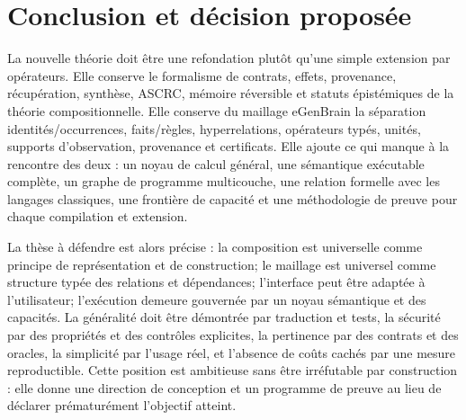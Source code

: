 \documentclass[11pt,a4paper]{article}
\begin{document}
\section{Conclusion et décision proposée}
La nouvelle théorie doit être une refondation plutôt qu'une simple extension par opérateurs. Elle conserve le formalisme de contrats, effets, provenance, récupération, synthèse, ASCRC, mémoire réversible et statuts épistémiques de la théorie compositionnelle. Elle conserve du maillage eGenBrain la séparation identités/occurrences, faits/règles, hyperrelations, opérateurs typés, unités, supports d'observation, provenance et certificats. Elle ajoute ce qui manque à la rencontre des deux : un noyau de calcul général, une sémantique exécutable complète, un graphe de programme multicouche, une relation formelle avec les langages classiques, une frontière de capacité et une méthodologie de preuve pour chaque compilation et extension.

La thèse à défendre est alors précise : la composition est universelle comme principe de représentation et de construction; le maillage est universel comme structure typée des relations et dépendances; l'interface peut être adaptée à l'utilisateur; l'exécution demeure gouvernée par un noyau sémantique et des capacités. La généralité doit être démontrée par traduction et tests, la sécurité par des propriétés et des contrôles explicites, la pertinence par des contrats et des oracles, la simplicité par l'usage réel, et l'absence de coûts cachés par une mesure reproductible. Cette position est ambitieuse sans être irréfutable par construction : elle donne une direction de conception et un programme de preuve au lieu de déclarer prématurément l'objectif atteint.
\end{document}

